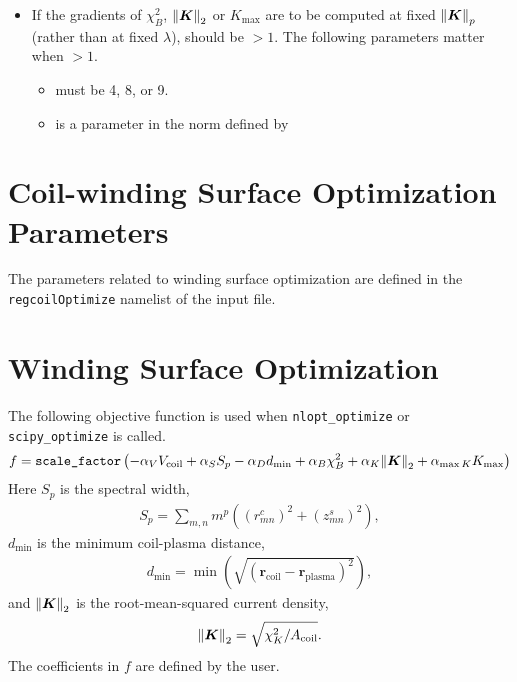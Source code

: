 \begin{itemize}
\item If the gradients of $\chi^2_B$, $\norm{\bm{K}}_2$ or $K_{\text{max}}$  are to be computed at fixed $\norm{\bm{K}}_p$ (rather than at fixed $\lambda$),  should be $>1$. The following parameters matter when  $>1$. 
	\begin{itemize}
	\item {} must be 4, 8, or 9. 
	\item {} is a parameter in the norm defined by 
	\end{itemize}
\end{itemize}

\section{Coil-winding Surface Optimization Parameters}

\myhrule

The parameters related to winding surface optimization are defined in the \texttt{regcoilOptimize} namelist of the input file. 

\myhrule

\section{Winding Surface Optimization}

The following objective function is used when \texttt{nlopt\_optimize} or \texttt{scipy\_optimize} is called.
\begin{gather}
f = \texttt{scale\_factor} \left( -\alpha_V V_{\text{coil}} + \alpha_S S_p - \alpha_D d_{\text{min}} + \alpha_B \chi^2_B + \alpha_K \norm{\bm{K}}_2 + \alpha_{\max K} K_{\max} \right)
\end{gather}
Here $S_p$ is the spectral width,
\begin{gather}
S_p = \sum_{m,n} m^p \left( \left(r_{mn}^c\right)^2 + \left(z_{mn}^s\right)^2 \right),
\label{spectral_width}
\end{gather}
$d_{\text{min}}$ is the minimum coil-plasma distance,
\begin{gather}
d_{\text{min}} = \min \left( \sqrt{ \left(\bm{r}_{\text{coil}} - \bm{r}_{\text{plasma}} \right)^2 } \right),
\end{gather}
and $\norm{\bm{K}}_2$ is the root-mean-squared current density,
\begin{gather}
\norm{\bm{K}}_2 = \sqrt{\chi^2_K/A_{\text{coil}}}.
\end{gather}
The coefficients in $f$ are defined by the user. 

